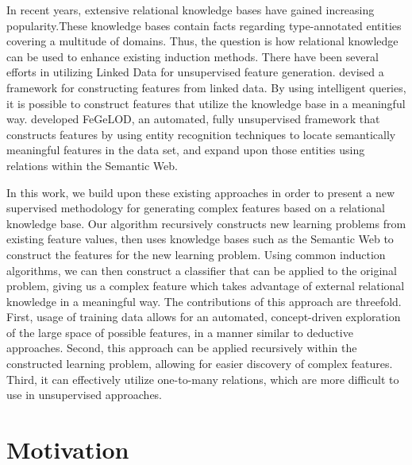 \documentclass{article}
\theoremstyle{definition}
\begin{document}
In recent years, extensive relational knowledge bases have gained increasing popularity.These knowledge bases contain facts regarding type-annotated entities covering a multitude of domains. %
 Thus, the question is how relational knowledge can be used to enhance existing induction methods.
There have been several efforts in utilizing Linked Data for unsupervised feature generation. \cite{cheng2011automatedfull} devised a framework for constructing features from linked data. By using intelligent queries, it is possible to construct features that utilize the knowledge base in a meaningful way. 
\cite{paulheim2012unsupervisedfull} developed FeGeLOD, an automated, fully unsupervised framework that constructs features by using entity recognition techniques to locate semantically meaningful features in the data set, and expand upon those entities using relations within the Semantic Web. %

In this work, we build upon these existing approaches in order to present a new supervised methodology for generating complex features based on a relational knowledge base. Our algorithm recursively constructs new learning problems from existing feature values, then uses knowledge bases such as the Semantic Web to construct the features for the new learning problem.
Using common induction algorithms, we can then construct a classifier that can be applied to the original problem, giving us a complex feature which takes advantage of external relational knowledge in a meaningful way.
The contributions of this approach are threefold. First, usage of training data allows for an automated, concept-driven exploration of the large space of possible features, in a manner similar to deductive approaches. Second, this approach can be applied recursively within the constructed learning problem, allowing for easier discovery of complex features. Third, it can effectively utilize one-to-many relations, which are more difficult to use in unsupervised approaches.

\section{Motivation} \label{motivation}
\end{document}
